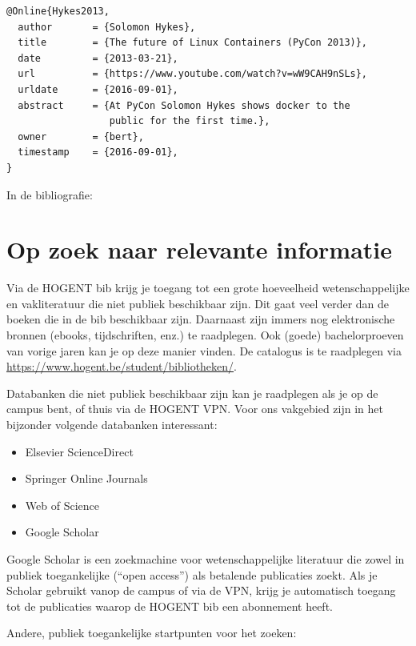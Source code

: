 \begin{verbatim}
@Online{Hykes2013,
  author       = {Solomon Hykes},
  title        = {The future of Linux Containers (PyCon 2013)},
  date         = {2013-03-21},
  url          = {https://www.youtube.com/watch?v=wW9CAH9nSLs},
  urldate      = {2016-09-01},
  abstract     = {At PyCon Solomon Hykes shows docker to the
                  public for the first time.},
  owner        = {bert},
  timestamp    = {2016-09-01},
}
\end{verbatim}

In de bibliografie: 

\section{Op zoek naar relevante informatie}
\label{sec:op_zoek_naar_relevante_informatie}

Via de HOGENT bib krijg je toegang tot een grote hoeveelheid wetenschappelijke en vakliteratuur die niet publiek beschikbaar zijn. Dit gaat veel verder dan de boeken die in de bib beschikbaar zijn. Daarnaast zijn immers nog elektronische bronnen (ebooks, tijdschriften, enz.) te raadplegen. Ook (goede) bachelorproeven van vorige jaren kan je op deze manier vinden. De catalogus is te raadplegen via \url{https://www.hogent.be/student/bibliotheken/}.

Databanken die niet publiek beschikbaar zijn kan je raadplegen als je op de campus bent, of thuis via de HOGENT VPN. Voor ons vakgebied zijn in het bijzonder volgende databanken interessant:

\begin{itemize}
  \item Elsevier ScienceDirect
  \item Springer Online Journals
  \item Web of Science
  \item Google Scholar
\end{itemize}

Google Scholar is een zoekmachine voor wetenschappelijke literatuur die zowel in publiek toegankelijke (``open access'') als betalende publicaties zoekt. Als je Scholar gebruikt vanop de campus of via de VPN, krijg je automatisch toegang tot de publicaties waarop de HOGENT bib een abonnement heeft.

Andere, publiek toegankelijke startpunten voor het zoeken:

